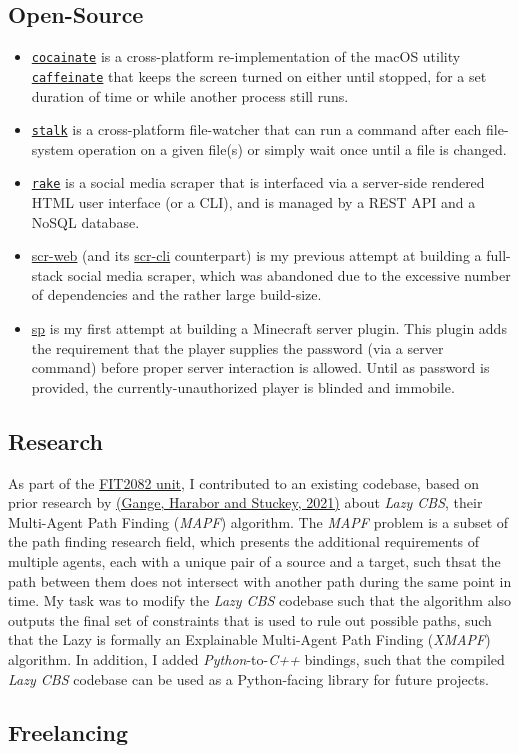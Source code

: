 \documentclass[a4paper]{article}
\begin{document}
	\subsection{Open-Source}

	\begin{itemize}
		\item \href{https://github.com/AppleGamer22/cocainate}{\texttt{cocainate}} is a cross-platform re-implementation of the macOS utility \href{https://github.com/apple-oss-distributions/PowerManagement/tree/main/caffeinate}{\texttt{caffeinate}} that keeps the screen turned on either until stopped, for a set duration of time or while another process still runs.
		\item \href{https://github.com/AppleGamer22/stalk}{\texttt{stalk}} is a cross-platform file-watcher that can run a command after each file-system operation on a given file(s) or simply wait once until a file is changed.
		\item \href{https://github.com/AppleGamer22/rake}{\texttt{rake}} is a social media scraper that is interfaced via a server-side rendered HTML user interface (or a CLI), and is managed by a REST API and a NoSQL database.
		\item \href{https://github.com/AppleGamer22/scr-web}{scr-web} (and its \href{https://github.com/AppleGamer22/scr-cli}{scr-cli} counterpart) is my previous attempt at building a full-stack social media scraper, which was abandoned due to the excessive number of dependencies and the rather large build-size.
		\item \href{https://github.com/AppleGamer22/sp}{sp} is my first attempt at building a Minecraft server plugin. This plugin adds the requirement that the player supplies the password (via a server command) before proper server interaction is allowed. Until as password is provided, the currently-unauthorized player is blinded and immobile.
	\end{itemize}

	\subsection{Research}
	As part of the \href{https://handbook.monash.edu/2021/units/FIT2082}{FIT2082 unit}, I contributed to an existing codebase, based on prior research by \href{https://ojs.aaai.org/index.php/ICAPS/article/view/3471}{(Gange, Harabor and Stuckey, 2021)} about \textsl{Lazy CBS}, their Multi-Agent Path Finding (\textsl{MAPF}) algorithm. The \textsl{MAPF} problem is a subset of the path finding research field, which presents the additional requirements of multiple agents, each with a unique pair of a source and a target, such thsat the path between them does not intersect with another path during the same point in time. My task was to modify the \textsl{Lazy CBS} codebase such that the algorithm also outputs the final set of constraints that is used to rule out possible paths, such that the Lazy is formally an Explainable Multi-Agent Path Finding (\textsl{XMAPF}) algorithm. In addition, I added \textsl{Python}-to-\textsl{C++} bindings, such that the compiled \textsl{Lazy CBS} codebase can be used as a Python-facing library for future projects.

	\subsection{Freelancing}
\end{document}
